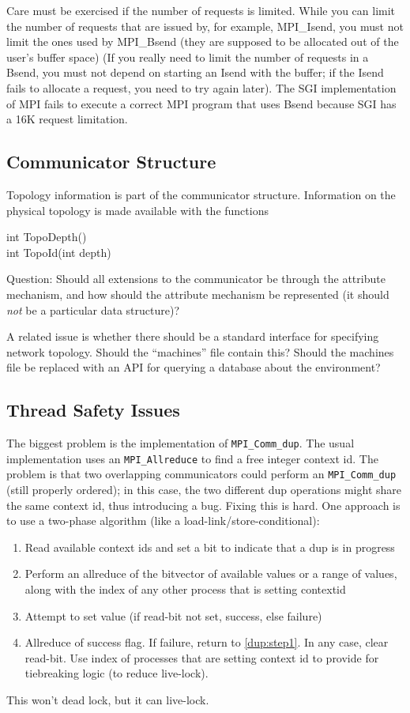 \documentclass{article}
\begin{document}
Care must be exercised if the number of requests is limited.
While you can limit
the number of requests that are issued by, for example, MPI\_Isend, you must
not limit the ones used by MPI\_Bsend (they are supposed to be allocated out
of the user's buffer space) (If you really need to limit the number of
requests in a Bsend, you must not depend on starting an Isend with the buffer;
if the Isend fails to allocate a request, you need to try again later).  The
SGI implementation of MPI fails to execute a correct MPI program that uses
Bsend because SGI has a 16K request limitation.

\subsection{Communicator Structure}

Topology information is part of the communicator structure.
Information on the physical topology is made available with the functions
\begin{description}
\item[int TopoDepth()]
\item[int TopoId(int depth)]
\end{description}

Question: Should all extensions to the communicator be through the attribute
mechanism, and how should the attribute mechanism be represented (it should
\emph{not} be a particular data structure)?

A related issue is whether there should be a standard interface for specifying
network topology.  Should the ``machines'' file contain this?  Should the
machines file be replaced with an API for querying a database about the
environment?

\subsection{Thread Safety Issues}
The biggest problem is the implementation of \texttt{MPI\_Comm\_dup}.  The
usual implementation uses an \texttt{MPI\_Allreduce} to find a free integer
context id.  The problem is that two overlapping communicators could perform an
\texttt{MPI\_Comm\_dup} (still properly ordered); in this case, the two
different dup operations might share the same context id, thus introducing a
bug.  Fixing this is hard.  One approach is to use a two-phase algorithm (like
a load-link/store-conditional):
\begin{enumerate}
\item Read available context ids and set a bit to indicate that a dup is in
  progress\label{dup:step1}
\item Perform an allreduce of the bitvector of available values or a range of
  values, along with the index of any other process that is setting contextid
\item Attempt to set value (if read-bit not set, success, else failure)
\item Allreduce of success flag.  If failure, return to \ref{dup:step1}.
In any case, clear read-bit.  Use index of processes that are setting context
id to provide for tiebreaking logic (to reduce live-lock).
\end{enumerate}
This won't dead lock, but it can live-lock.  
\end{document}
